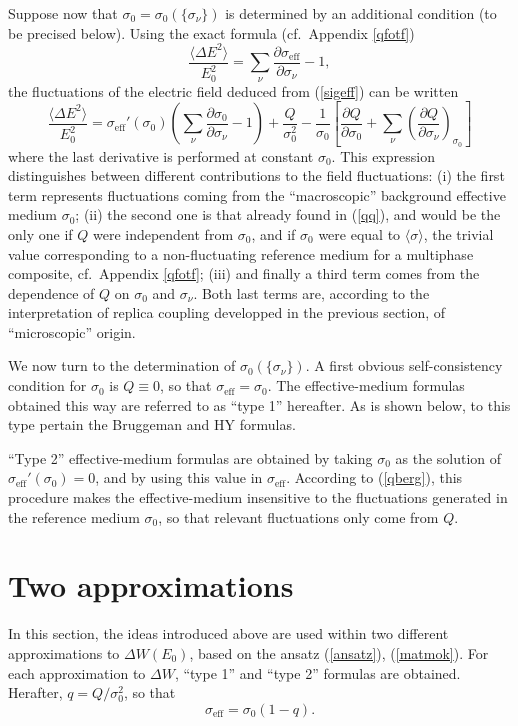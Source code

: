 Suppose now that $\sigma_0=\sigma_0(\{\sigma_\nu\})$ is determined
by an additional condition (to be precised below). Using the exact
formula \cite{BERG78} (cf.\ Appendix \ref{qfotf})
\begin{equation}
\label{berg}
\frac{\langle\Delta E^2\rangle}{E_0^2}=\sum_\nu \frac{\partial \sigma_{\text{eff}}}{\partial \sigma_\nu} -1,
\end{equation}
the fluctuations of the electric field deduced from (\ref{sigeff})
can be written
\begin{equation}
\label{qberg}
\frac{\langle\Delta E^2\rangle}{E_0^2}=\sigma_{\text{eff}}'(\sigma_0)\left(\sum_\nu
\frac{\partial \sigma_0}{\partial \sigma_\nu}-1\right)+\frac{Q}{\sigma_0^2}-\frac{1}{\sigma_0}
\left[\frac{\partial Q}{\partial \sigma_0}+\sum_\nu\left(\frac{\partial Q}{\partial \sigma_\nu}\right)_{\sigma_0}\right]
\end{equation}
where the last derivative is performed at constant $\sigma_0$. This
expression distinguishes between different contributions to the field
fluctuations: (i) the first term represents fluctuations coming from
the ``macroscopic'' background effective medium $\sigma_0$; (ii) the
second one is that already found in (\ref{qq}), and would be the only
one if $Q$ were independent from $\sigma_0$, and if
$\sigma_0$ were equal to $\langle\sigma\rangle$, 
the trivial value corresponding
to a non-fluctuating reference medium for a multiphase composite, cf.\ Appendix \ref{qfotf}; (iii) and finally a third
term comes from the dependence of $Q$ on $\sigma_0$ and
$\sigma_\nu$. Both last terms are, according to the interpretation of
replica coupling developped in the previous section, of
``microscopic'' origin.

We now turn to the determination of $\sigma_0(\{\sigma_\nu\})$. A
first obvious self-consistency condition for $\sigma_0$ is $Q\equiv 0$,
so that $\sigma_{\text{eff}}=\sigma_0$. The effective-medium formulas obtained
this way are referred to as ``type 1'' hereafter. As is shown
below, to this type pertain the Bruggeman and HY formulas.

``Type 2'' effective-medium formulas are obtained by taking $\sigma_0$
as the solution of $\sigma_{\text{eff}}'(\sigma_0)=0$, and by using
this value in $\sigma_{\text{eff}}$. According to (\ref{qberg}), this
procedure makes the effective-medium insensitive to the fluctuations
generated in the reference medium $\sigma_0$, so that relevant fluctuations
only come from $Q$.

\section{Two approximations}
\label{tm}
In this section, the ideas introduced above are used within two
different approximations to $\Delta W(E_0)$, based on the ansatz
(\ref{ansatz}), (\ref{matmok}). For each approximation to $\Delta W$,
``type 1'' and ``type 2'' formulas are obtained. Herafter,
$q=Q/\sigma_0^2$, so that
\begin{equation}
\label{sigefq}
\sigma_{\text{eff}}=\sigma_0(1-q).
\end{equation}


